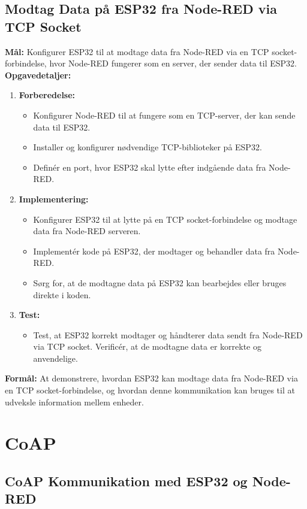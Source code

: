 \subsection*{Modtag Data på ESP32 fra Node-RED via TCP Socket}
\textbf{Mål:} Konfigurer ESP32 til at modtage data fra Node-RED via en TCP socket-forbindelse, hvor Node-RED fungerer som en server, der sender data til ESP32.
\newline\newline\noindent
\textbf{Opgavedetaljer:}
\begin{enumerate}
	\item \textbf{Forberedelse:}
	\begin{itemize}
		\item Konfigurer Node-RED til at fungere som en TCP-server, der kan sende data til ESP32.
		\item Installer og konfigurer nødvendige TCP-biblioteker på ESP32.
		\item Definér en port, hvor ESP32 skal lytte efter indgående data fra Node-RED.
	\end{itemize}
	\item \textbf{Implementering:}
	\begin{itemize}
		\item Konfigurer ESP32 til at lytte på en TCP socket-forbindelse og modtage data fra Node-RED serveren.
		\item Implementér kode på ESP32, der modtager og behandler data fra Node-RED.
		\item Sørg for, at de modtagne data på ESP32 kan bearbejdes eller bruges direkte i koden.
	\end{itemize}
	\item \textbf{Test:}
	\begin{itemize}
		\item Test, at ESP32 korrekt modtager og håndterer data sendt fra Node-RED via TCP socket. Verificér, at de modtagne data er korrekte og anvendelige.
	\end{itemize}
\end{enumerate}
\textbf{Formål:} At demonstrere, hvordan ESP32 kan modtage data fra Node-RED via en TCP socket-forbindelse, og hvordan denne kommunikation kan bruges til at udveksle information mellem enheder.

\section{CoAP}
\subsection*{CoAP Kommunikation med ESP32 og Node-RED}

